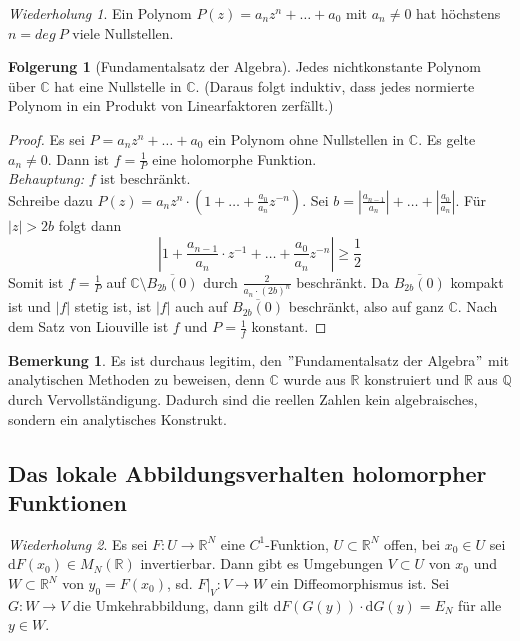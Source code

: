 \documentclass[11pt,titlepage]{article}
\theoremstyle{definition}
\newtheorem{corollary}[theorem]{Folgerung}
\newtheorem{remark}{Bemerkung}
\theoremstyle{remark}
\newtheorem*{repetition}{Wiederholung}
\begin{document}
	\begin{repetition}
		Ein Polynom $P(z)=a_n z^n+\ldots +a_0$ mit $a_n\neq 0$ hat höchstens $n=deg\ P$ viele 
		Nullstellen.
	\end{repetition}
	
	\begin{corollary}[Fundamentalsatz der Algebra]
		Jedes nichtkonstante Polynom über $\mathbb{C}$ hat eine Nullstelle in $\mathbb{C}$. 
		(Daraus folgt induktiv, dass jedes normierte Polynom in ein Produkt von Linearfaktoren 
		zerfällt.)
	\end{corollary}
	
	\begin{proof}
		Es sei $P=a_n z^n +\ldots +a_0$ ein Polynom ohne Nullstellen in $\mathbb{C}$. Es gelte 
		$a_n \neq 0$. Dann ist $f=\frac{1}{P}$ eine holomorphe Funktion. \\
		\textsl{Behauptung:} $f$ ist beschränkt. \\
		Schreibe dazu $P(z)=a_n z^n \cdot (1+\ldots +\frac{a_0}{a_n} z^{-n})$. Sei 
		$b=|\frac{a_{n-1}}{a_n}|+\ldots +|\frac{a_0}{a_n}|$. Für $|z|>2b$ folgt dann
		\[ |1+\frac{a_{n-1}}{a_n}\cdot z^{-1}+\ldots +\frac{a_0}{a_n} z^{-n}|\geq\frac{1}{2} \]
		Somit ist $f=\frac{1}{P}$ auf $\mathbb{C}\setminus\overline{B_{2b}(0)}$ durch 
		$\frac{2}{a_n \cdot (2b)^n}$ beschränkt. Da $\overline{B_{2b}(0)}$ kompakt ist und 
		$|f|$ stetig ist, ist $|f|$ auch auf $\overline{B_{2b}(0)}$ beschränkt, also auf ganz $\mathbb{C}$. 
		Nach dem Satz von Liouville ist $f$ und $P=\frac{1}{f}$ konstant.
	\end{proof}
	
	\begin{remark}
		Es ist durchaus legitim, den $"$Fundamentalsatz der Algebra$"$ mit analytischen 
		Methoden zu beweisen, denn $\mathbb{C}$ wurde aus $\mathbb{R}$ konstruiert und 
		$\mathbb{R}$ aus $\mathbb{Q}$ durch Vervollständigung. Dadurch sind die reellen Zahlen 
		kein algebraisches, sondern ein analytisches Konstrukt.
	\end{remark}
	
	\subsection{Das lokale Abbildungsverhalten holomorpher Funktionen}
	
	\begin{repetition}
		Es sei $F:U\to \mathbb{R}^N$ eine $C^1$-Funktion, $U\subset \mathbb{R}^N$ offen, 
		bei $x_0 \in U$ sei $\mathrm{d}F(x_0)\in M_N (\mathbb{R})$ invertierbar. Dann gibt es 
		Umgebungen $V\subset U$ von $x_0$ und $W\subset \mathbb{R}^N$ von $y_0=F(x_0)$, 
		sd. $F|_V :V\to W$ ein Diffeomorphismus ist. Sei $G:W\to V$ die Umkehrabbildung, dann 
		gilt $\mathrm{d}F(G(y))\cdot \mathrm{d}G(y)=E_N$ für alle $y\in W$.
	\end{repetition}
	
\end{document}
